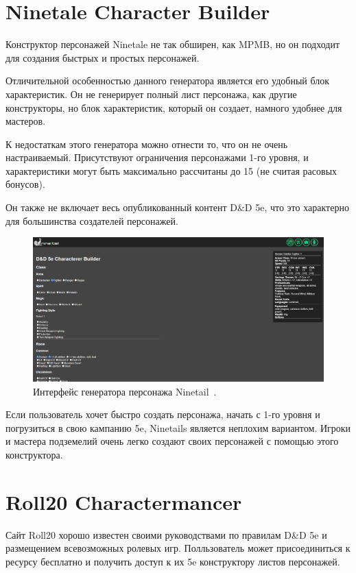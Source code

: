 \section{Ninetale Character Builder}

Конструктор персонажей Ninetale не так обширен, как MPMB, но он подходит для создания быстрых и простых персонажей. 

Отличительной особенностью данного генератора является его удобный блок характеристик. Он не генерирует полный лист персонажа, как другие конструкторы, но блок характеристик, который он создает, намного удобнее для мастеров.

К недостаткам этого генератора можно отнести то, что он не очень настраиваемый. Присутствуют ограничения персонажами 1-го уровня, и характеристики могут быть максимально рассчитаны до 15 (не считая расовых бонусов). 

Он также не включает весь опубликованный контент D\&D 5e, что это характерно для большинства создателей персонажей.

\begin{figure}[H]
    \centering
    \includegraphics[scale=0.3]{Ninetail.png}
    \caption{Интерфейс генератора персонажа Ninetail~\cite{ninetail}.}
    \label{fig:ninetail}
\end{figure}

Если пользователь хочет быстро создать персонажа, начать с 1-го уровня и погрузиться в свою кампанию 5e, Ninetails является неплохим вариантом. Игроки и мастера подземелий очень легко создают своих персонажей с помощью этого конструктора.

\section{Roll20 Charactermancer}

Сайт Roll20 хорошо известен своими руководствами по правилам D\&D 5e и размещением всевозможных ролевых игр. Полльзователь может присоединиться к ресурсу бесплатно и получить доступ к их 5e конструктору листов персонажей.

